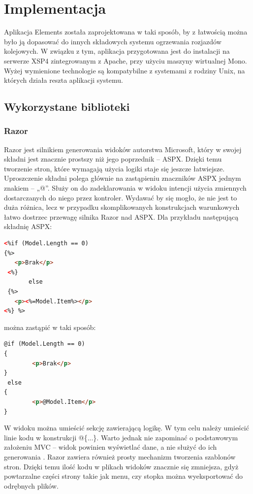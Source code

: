 \chapter{Implementacja}

Aplikacja Elements została zaprojektowana w taki sposób, by z łatwością można było ją dopasować do innych składowych systemu ogrzewania rozjazdów kolejowych. W związku z tym, aplikacja przygotowana jest do instalacji na serwerze XSP4 zintegrowanym z Apache, przy użyciu maszyny wirtualnej Mono. Wyżej wymienione technologie są kompatybilne z systemami z rodziny Unix, na których działa reszta aplikacji systemu.

\section{Wykorzystane biblioteki}

\subsection{Razor}

Razor jest silnikiem generowania widoków autorstwa Microsoft, który w swojej składni jest znacznie prostszy niż jego poprzednik – ASPX. Dzięki temu tworzenie stron, które wymagają użycia logiki staje się jeszcze łatwiejsze. Uproszczenie składni polega głównie na zastąpieniu znaczników ASPX jednym znakiem -- „@”. Służy on do zadeklarowania w widoku intencji użycia zmiennych dostarczanych do niego przez kontroler. Wydawać by się mogło, że nie jest to duża różnica, lecz w przypadku skomplikowanych konstrukcjach warunkowych łatwo dostrzec przewagę silnika Razor nad ASPX. Dla przykładu następującą składnię ASPX:

\begin{lstlisting}[language=HTML]
<%if (Model.Length == 0)
{%>
   <p>Brak</p>
 <%}
       else
 {%>
   <p><%=Model.Item%></p>
<%} %>
\end{lstlisting}
można zastąpić w taki sposób:
\begin{lstlisting}[language=HTML]
@if (Model.Length == 0)
{
        <p>Brak</p>
}
 else
{
        <p>@Model.Item</p>
}
\end{lstlisting}
W widoku można umieścić sekcję zawierającą logikę. W tym celu należy umieścić linie kodu w konstrukcji @\{...\}. Warto jednak nie zapominać o podstawowym założeniu MVC – widok powinien wyświetlać dane, a nie służyć do ich generowania \cite{design-patterns}.
Razor zawiera również prosty mechanizm tworzenia szablonów stron. Dzięki temu ilość kodu w plikach widoków znacznie się zmniejsza, gdyż powtarzalne części strony takie jak menu, czy stopka można wyeksportować do odrębnych plików.

